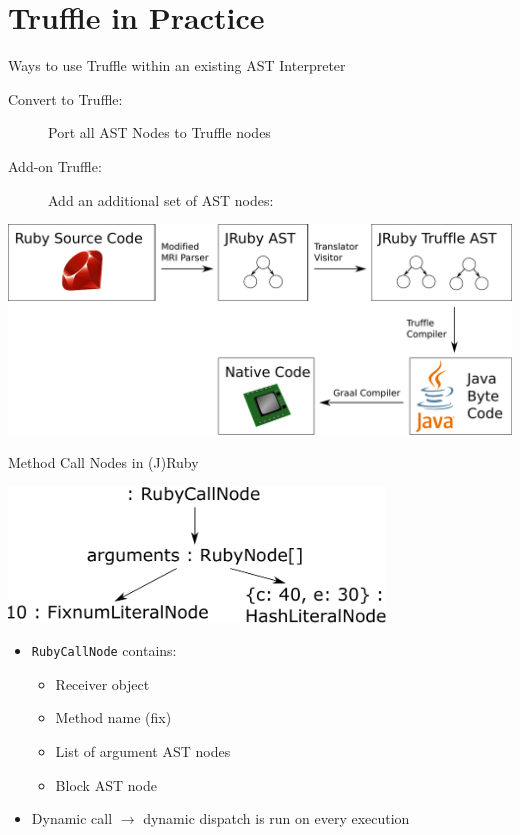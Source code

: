 \documentclass[xcolor=dvipsname,handout]{beamer} %
\begin{document}
\section{Truffle in Practice}

\begin{frame}{Ways to use Truffle within an existing AST Interpreter}

\begin{description}
 \item[Convert to Truffle:] Port all AST Nodes to Truffle nodes
 \item[Add-on Truffle:] Add an additional set of AST nodes:
\end{description}
\begin{table}
  \centering
  \includegraphics[width=1.0\textwidth]{graaltruffle.pdf}
\end{table}
\end{frame}

\begin{frame}{Method Call Nodes in (J)Ruby}
\begin{table}
    \centering
    \includegraphics[width=0.75\textwidth]{kwarg_1.pdf}
\end{table}

\begin{itemize}
    \item \lstinline{RubyCallNode} contains:
      \begin{itemize}
      \item Receiver object
      \item Method name (fix)
      \item List of argument AST nodes
      \item Block AST node
      \end{itemize}
    \item Dynamic call $\rightarrow$ dynamic dispatch is run on every execution
\end{itemize}
\end{frame}
\end{document}
